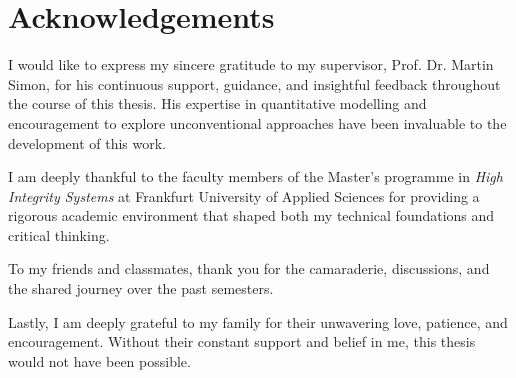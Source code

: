 \chapter*{Acknowledgements}


I would like to express my sincere gratitude to my supervisor, Prof. Dr. Martin Simon, for his continuous support, guidance, and insightful feedback throughout the course of this thesis. His expertise in quantitative modelling and encouragement to explore unconventional approaches have been invaluable to the development of this work.

I am deeply thankful to the faculty members of the Master’s programme in \textit{High Integrity Systems} at Frankfurt University of Applied Sciences for providing a rigorous academic environment that shaped both my technical foundations and critical thinking.


To my friends and classmates, thank you for the camaraderie, discussions, and the shared journey over the past semesters.

Lastly, I am deeply grateful to my family for their unwavering love, patience, and encouragement. Without their constant support and belief in me, this thesis would not have been possible.
